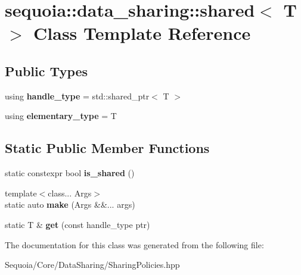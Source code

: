 \hypertarget{classsequoia_1_1data__sharing_1_1shared}{}\section{sequoia\+::data\+\_\+sharing\+::shared$<$ T $>$ Class Template Reference}
\label{classsequoia_1_1data__sharing_1_1shared}
\subsection*{Public Types}
\begin{DoxyCompactItemize}
\item 
\mbox{\label{classsequoia_1_1data__sharing_1_1shared_a3cb63ff7dfb02b8c0f353e10935b497a}} 
using {\bfseries handle\+\_\+type} = std\+::shared\+\_\+ptr$<$ T $>$
\item 
\mbox{\label{classsequoia_1_1data__sharing_1_1shared_ada8e41be0a357d9317623d4c646cceee}} 
using {\bfseries elementary\+\_\+type} = T
\end{DoxyCompactItemize}
\subsection*{Static Public Member Functions}
\begin{DoxyCompactItemize}
\item 
\mbox{\label{classsequoia_1_1data__sharing_1_1shared_aea719f45b375f7734d30b33d17627219}} 
static constexpr bool {\bfseries is\+\_\+shared} ()
\item 
\mbox{\label{classsequoia_1_1data__sharing_1_1shared_a816da1c025c07f801f9ed4c2ab40457f}} 
{\footnotesize template$<$class... Args$>$ }\\static auto {\bfseries make} (Args \&\&... args)
\item 
\mbox{\label{classsequoia_1_1data__sharing_1_1shared_aac0573b04e676030471944e739162087}} 
static T \& {\bfseries get} (const handle\+\_\+type ptr)
\end{DoxyCompactItemize}


The documentation for this class was generated from the following file\+:\begin{DoxyCompactItemize}
\item 
Sequoia/\+Core/\+Data\+Sharing/Sharing\+Policies.\+hpp\end{DoxyCompactItemize}
